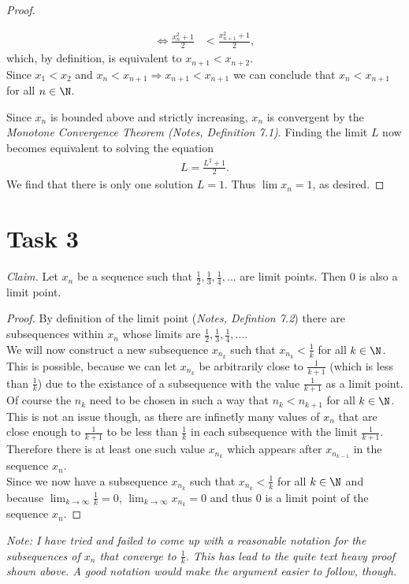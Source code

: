 \documentclass{article}
\begin{document}
\begin{proof}
\begin{adjustwidth}{2em}{0pt}
\begin{claimproof}
\begin{align*}
        \Leftrightarrow \frac{x_n^2+1}{2} & <\frac{x_{n+1}^2+1}{2},
      \end{align*}
      which, by definition, is equivalent to $x_{n+1}<x_{n+2}$.\\
      Since $x_1<x_2$ and $x_n<x_{n+1}\Rightarrow x_{n+1}<x_{n+1}$ we can conclude that $x_n<x_{n+1}$ for all $n\in\N$.
    \end{claimproof}
  \end{adjustwidth}
  Since $x_n$ is bounded above and strictly increasing, $x_n$ is convergent by the \emph{Monotone Convergence Theorem (Notes, Definition 7.1)}. Finding the limit $L$ now becomes equivalent to solving the equation
  \begin{align*}
    L=\frac{L^2+1}{2}.
  \end{align*}
  We find that there is only one solution $L=1$. Thus $\lim x_n=1$, as desired.
\end{proof}
\section*{Task 3}
\emph{Claim.} Let $x_n$ be a sequence such that $\frac{1}{2}, \frac{1}{3}, \frac{1}{4}, ...$ are limit points. Then $0$ is also a limit point.
\begin{proof}
  By definition of the limit point (\emph{Notes, Defintion 7.2}) there are subsequences within $x_n$ whose limits are $\frac{1}{2}, \frac{1}{3}, \frac{1}{4}, ...$. \\
  We will now construct a new subsequence $x_{n_k}$ such that $x_{n_k}<\frac{1}{k}$ for all $k\in\N$.\\
  This is possible, because we can let $x_{n_k}$ be arbitrarily close to $\frac{1}{k+1}$ (which is less than $\frac{1}{k}$) due to the existance of a subsequence with the value $\frac{1}{k+1}$ as a limit point. Of course the $n_k$ need to be chosen in such a way that $n_k<n_{k+1}$ for all $k\in\N$. This is not an issue though, as there are infinetly many values of $x_n$ that are close enough to $\frac{1}{k+1}$ to be less than $\frac{1}{k}$ in each subsequence with the limit $\frac{1}{k+1}$. Therefore there is at least one such value $x_{n_k}$ which appears after $x_{n_{k-1}}$ in the sequence $x_n$.\\
  Since we now have a subsequence $x_{n_k}$ such that $x_{n_k}<\frac{1}{k}$ for all $k\in\N$ and because $\lim_{k\to\infty} \frac{1}{k} = 0$, $\lim_{k\to\infty} x_{n_k}=0$ and thus $0$ is a limit point of the sequence $x_n$.
\end{proof}
\emph{Note: I have tried and failed to come up with a reasonable notation for the subsequences of $x_n$ that converge to $\frac{1}{k}$. This has lead to the quite text heavy proof shown above. A good notation would make the argument easier to follow, though.}
\end{document}
